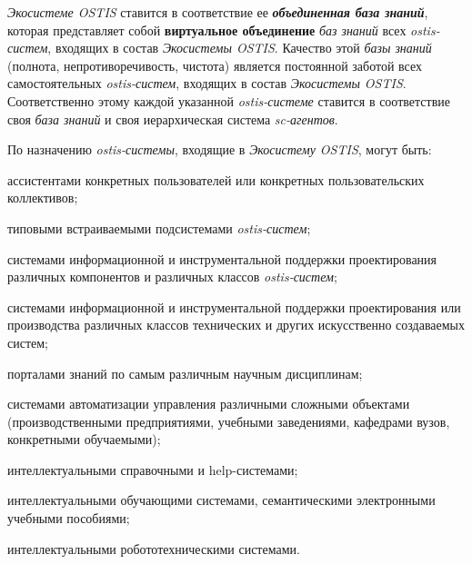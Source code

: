 \begin{SCn}
{\textit{Экосистеме OSTIS} ставится в соответствие ее \textit{\textbf{объединенная база знаний}}, которая представляет собой \textbf{виртуальное объединение} \textit{баз знаний} всех \textit{ostis-систем}, входящих в состав \textit{Экосистемы OSTIS}. Качество этой \textit{базы знаний} (полнота, непротиворечивость, чистота) является постоянной заботой всех самостоятельных \textit{ostis-систем}, входящих в состав \textit{Экосистемы OSTIS}. Соответственно этому каждой указанной \textit{ostis-системе} ставится в соответствие своя \textit{база знаний} и своя иерархическая система \textit{sc-агентов}.

По назначению \textit{ostis-системы}, входящие в \textit{Экосистему OSTIS}, могут быть:
\begin{scnitemize}
    \item ассистентами конкретных пользователей или конкретных пользовательских коллективов;
    \item типовыми встраиваемыми подсистемами \textit{ostis-систем};
    \item системами информационной и инструментальной поддержки проектирования различных компонентов и различных классов \textit{ostis-систем};
    \item системами информационной и инструментальной поддержки проектирования или производства различных классов технических и других искусственно создаваемых систем;
    \item порталами знаний по самым различным научным дисциплинам; 
    \item системами автоматизации управления различными сложными объектами (производственными предприятиями, учебными заведениями, кафедрами вузов, конкретными обучаемыми);
    \item интеллектуальными справочными и help-системами;
    \item интеллектуальными обучающими системами, семантическими электронными учебными пособиями;
    \item интеллектуальными робототехническими системами.
\end{scnitemize}
}

\scnresetlevel

\end{SCn}
